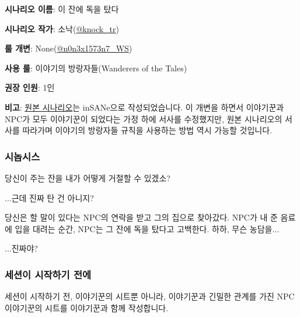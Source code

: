 \documentclass{report}
\begin{document}
	\textbf{시나리오 이름}: 이 잔에 독을 탔다
	
	\textbf{시나리오 작가}: 소낙(\href{https://twitter.com/knock_tr}{@knock\_tr})
	
	\textbf{룰 개변}: None(\href{https://www.twitter.com/n0n3x1573n7_WS}{@n0n3x1573n7\_WS})
	
	\textbf{사용 룰}: 이야기의 방랑자들(Wanderers of the Tales)
	
	\textbf{권장 인원}: 1인
	
	\textbf{비고}: \href{https://fwalker.postype.com/post/3654634}{원본 시나리오}는 inSANe으로 작성되었습니다. 이 개변을 하면서 이야기꾼과 NPC가 모두 이야기꾼이 되었다는 가정 하에 서사를 수정했지만, 원본 시나리오의 서사를 따라가며 이야기의 방랑자들 규칙을 사용하는 방법 역시 가능할 것입니다.
	
	\subsubsection*{시놉시스}
	{\storyfont \Large 당신이 주는 잔을 내가 어떻게 거절할 수 있겠소?}
	
	{\storyfont \Large ...근데 진짜 탄 건 아니지?}
	
	당신은 할 말이 있다는 NPC의 연락을 받고 그의 집으로 찾아갔다. NPC가 내 준 음료에 입을 대려는 순간, NPC는 그 잔에 독을 탔다고 고백한다. 하하, 무슨 농담을...
	
	...진짜야?
	
	\subsubsection*{세션이 시작하기 전에}
		세션이 시작하기 전, 이야기꾼의 시트뿐 아니라, 이야기꾼과 긴밀한 관계를 가진 NPC 이야기꾼의 시트를 이야기꾼과 함께 작성합니다.
\end{document}
